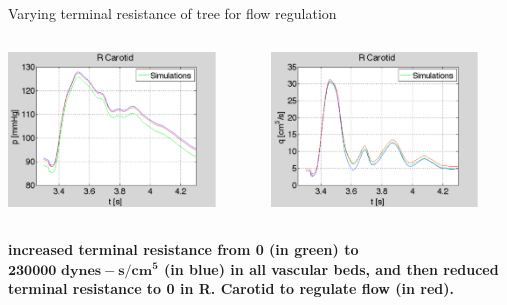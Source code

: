 \documentclass{beamer}
\begin{document}
\begin{frame}{Varying terminal resistance of tree for flow regulation}

	\begin{columns}
		\begin{column}[r]{5.5cm}
			\includegraphics[width=5.5cm]{pcarotid.pdf}
		\end{column}
		\begin{column}[l]{5.5cm}
			\includegraphics[width=5.5cm]{qcarotid.pdf}
		\end{column}
	\end{columns}
	
	\begin{center}
		\footnotesize
		\textbf{increased terminal resistance from 0 (in green) to $\mathbf{230000\,\,dynes-s/cm^5}$ (in blue) in all vascular beds, and then reduced terminal resistance to 0 in R. Carotid to regulate flow (in red).}
	\end{center}

\end{frame}

\end{document}
